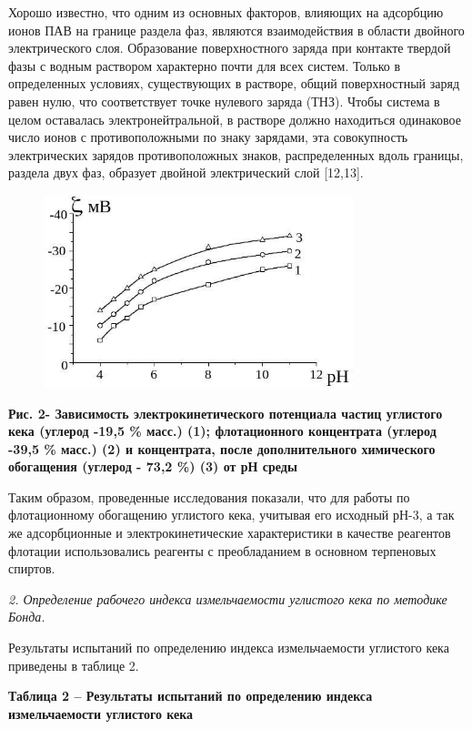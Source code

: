 Хорошо известно, что одним из основных факторов, влияющих на адсорбцию
ионов ПАВ на границе раздела фаз, являются взаимодействия в области
двойного электрического слоя. Образование поверхностного заряда при
контакте твердой фазы с водным раствором характерно почти для всех
систем. Только в определенных условиях, существующих в растворе, общий
поверхностный заряд равен нулю, что соответствует точке нулевого заряда
(ТНЗ). Чтобы система в целом оставалась электронейтральной, в растворе
должно находиться одинаковое число ионов с противоположными по знаку
зарядами, эта совокупность электрических зарядов противоположных знаков,
распределенных вдоль границы, раздела двух фаз, образует двойной
электрический слой {[}12,13{]}.

\begin{figure}[H]
	\centering
	\includegraphics[width=0.8\textwidth]{assets/1035}
	\caption*{}
\end{figure}

\textbf{Рис. 2- Зависимость электрокинетического потенциала частиц
углистого кека (углерод -19,5 \% масс.) (1); флотационного концентрата
(углерод -39,5 \% масс.) (2) и концентрата, после дополнительного
химического обогащения (углерод - 73,2 \%) (3) от рН среды}

Таким образом, проведенные исследования показали, что для работы по
флотационному обогащению углистого кека, учитывая его исходный рН-3, а
так же адсорбционные и электрокинетические характеристики в качестве
реагентов флотации использовались реагенты с преобладанием в основном
терпеновых спиртов.

\emph{2. Определение рабочего индекса измельчаемости углистого кека по
методике Бонда.}

Результаты испытаний по определению индекса измельчаемости углистого
кека приведены в таблице 2.

\textbf{Таблица 2 -- Результаты испытаний по определению индекса
измельчаемости углистого кека}

